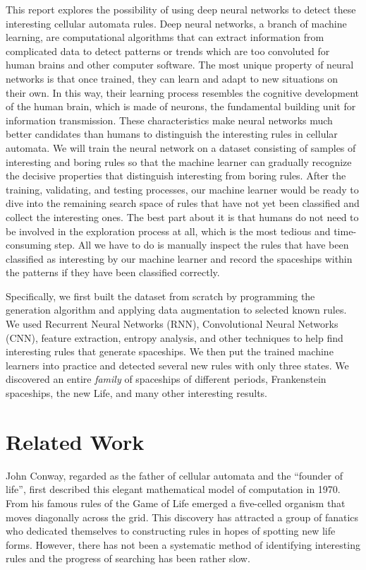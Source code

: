 \documentclass[12pt]{article}
\numberwithin{figure}{section} %
\begin{document}
This report explores the possibility of using deep neural networks to detect these interesting cellular automata rules. Deep neural networks, a branch of machine learning, are computational algorithms that can extract information from complicated data to detect patterns or trends which are too convoluted for human brains and other computer software. The most unique property of neural networks is that once trained, they can learn and adapt to new situations on their own. In this way, their learning process resembles the cognitive development of the human brain, which is made of neurons, the fundamental building unit for information transmission. These characteristics make neural networks much better candidates than humans to distinguish the interesting rules in cellular automata. We will train the neural network on a dataset consisting of samples of interesting and boring rules so that the machine learner can gradually recognize the decisive properties that distinguish interesting from boring rules. After the training, validating, and testing processes, our machine learner would be ready to dive into the remaining search space of rules that have not yet been classified and collect the interesting ones. The best part about it is that humans do not need to be involved in the exploration process at all, which is the most tedious and time-consuming step. All we have to do is manually inspect the rules that have been classified as interesting by our machine learner and record the spaceships within the patterns if they have been classified correctly. 

Specifically, we first built the dataset from scratch by programming the generation algorithm and applying data augmentation to selected known rules. We used Recurrent Neural Networks (RNN), Convolutional Neural Networks (CNN), feature extraction, entropy analysis, and other techniques to help find interesting rules that generate spaceships. We then put the trained machine learners into practice and detected several new rules with only three states. We discovered an entire \textit{family} of spaceships of different periods, Frankenstein spaceships, the new Life, and many other interesting results.

\newpage
\section{Related Work}
\label{Related Work}
John Conway, regarded as the father of cellular automata and the “founder of life”, first described this elegant mathematical model of computation in 1970. From his famous rules of the Game of Life emerged a five-celled organism that moves diagonally across the grid. This discovery has attracted a group of fanatics who dedicated themselves to constructing rules in hopes of spotting new life forms. However, there has not been a systematic method of identifying interesting rules and the progress of searching has been rather slow. 
\end{document}
